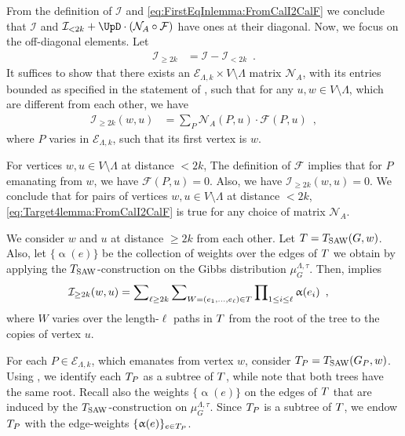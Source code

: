 \documentclass[11pt,reqno]{amsart}
\numberwithin{equation}{section}
\newcommand{\cE}{{\mathcal{E}}}
\newcommand{\cF}{{\mathcal{F}}}
\newcommand{\cI}{{\mathcal{I}}}
\newcommand{\cN}{{\mathcal{N}}}
\newcommand{\applegreen}[1]{ {\color{applegreen}#1}}
\newcommand{\blue}[1]{{\color{blue}#1}}
\newcommand{\bluepigment}[1]{{\color{blue(pigment)}#1}}
\newcommand{\capri}[1]{{\color{capri}#1}}
\newcommand{\goldenbrown}[1]{{\color{goldenbrown}#1}}
\newcommand{\iris}[1]{{\color{iris}#1}}
\newcommand{\red}[1]{{\color{red}#1}}
\newcommand{\ExtV}{\iris{\cE}}
\newcommand{\Tsaw}{T_{\rm SAW}}
\newcommand{\infmatrix}{\cI}
\newcommand{\VToEdge}{\UpD}
\renewcommand{\applegreen}[1]{#1}
\renewcommand{\blue}[1]{#1}
\renewcommand{\bluepigment}[1]{#1}
\renewcommand{\capri}[1]{#1}
\renewcommand{\goldenbrown}[1]{#1}
\renewcommand{\iris}[1]{#1}
\renewcommand{\red}[1]{#1}
\newcommand{\saw}{{\rm SAW}}
\newcommand{\ke}{\blue{e}}
\newcommand{\ki}{\capri{i}}
\newcommand{\kk}{\bluepigment{k}}
\newcommand{\kell}{{\color{green(pigment)}\ell}}%
\newcommand{\kP}{\goldenbrown{P}}
\newcommand{\ku}{\red{u}}
\newcommand{\kW}{\blue{W}}
\newcommand{\kw}{\blue{w}}
\renewcommand{\ke}{e}
\renewcommand{\ki}{i}
\renewcommand{\kk}{k}
\renewcommand{\kell}{\ell}
\renewcommand{\kP}{P}
\renewcommand{\ku}{u}
\renewcommand{\kW}{W}
\renewcommand{\kw}{w}
\newcommand{\SemExtdInfMatrix}{\cF}
\newcommand{\SymWeightMA}{\cN_A}
\newcommand{\infweight}{\upalpha}
\begin{document}
From the  definition of $\infmatrix$ and \eqref{eq:FirstEqInlemma:FromCalI2CalF} we conclude that $\infmatrix$ and 
$ \infmatrix_{<2\kk}+\VToEdge\cdot\left(\SymWeightMA \circ \SemExtdInfMatrix \right)$
have ones at their diagonal. 
%
Now, we focus on the off-diagonal elements. Let 
\begin{align}\label{eq:DefOfILarge2k}
\infmatrix_{\geq 2\kk} &=\infmatrix-\infmatrix_{<2\kk}\enspace.
\end{align}
It suffices to show that there exists an $\ExtV_{\Lambda,\kk}\times V\setminus \Lambda$ matrix $\SymWeightMA$, 
with its entries bounded as specified in the statement of ,   
such that for any $\ku,\kw\in V\setminus \Lambda$, which are different from each other, 
we have 
\begin{align}\label{eq:Target4lemma:FromCalI2CalF}
\infmatrix_{\geq 2\kk}(\kw,\ku) &= \sum\nolimits_{\kP} \SymWeightMA(\kP,\ku) \cdot \SemExtdInfMatrix(\kP,\ku)
\enspace,
\end{align}
where $\kP$ varies in $\ExtV_{\Lambda, \kk}$, such that its first vertex is $\kw$.




For vertices $\kw,\ku\in V\setminus \Lambda$ at distance $< 2\kk$,  The definition of  $\SemExtdInfMatrix$ implies that 
for  $\kP$ emanating from $\kw$, we have $ \SemExtdInfMatrix(\kP,\ku)=0$. Also, we have $\infmatrix_{\geq 2\kk}(\kw,\ku)=0$.
We conclude that for pairs of vertices  $\kw,\ku\in V\setminus \Lambda$ at distance $< 2\kk$,
 \eqref{eq:Target4lemma:FromCalI2CalF} is true for any choice of matrix $\SymWeightMA$. 




We consider  $\kw$ and $\ku$ at distance $\geq 2\kk$ from each other. Let $\EMTw=T_{\saw}(G, \kw)$.  Also, let $\{\infweight(\ke)\}$ 
be the collection of weights over the edges of $T$ we obtain  by applying the $\Tsaw$-construction on the Gibbs 
distribution $\mu^{\Lambda,\tau}_G$.  Then,  implies 
\begin{align}\label{eq:IfVsWeightscFVsVi}
\infmatrix_{\geq 2\kk}(\kw,\ku) &=\sum\nolimits_{\kell\geq 2\kk}
\sum\nolimits_{\kW=(\ke_1, \ldots, \ke_{\kell}) \in \EMTw}
\prod\nolimits_{1 \leq \ki\leq \kell}\infweight(\ke_{\ki}) \enspace,
\end{align}
where $\kW$ varies over the length-$\kell$ paths in $T$ from the root of the tree to the copies of vertex $\ku$.




For each $\kP\in \ExtV_{\Lambda,k}$, which emanates from vertex $\kw$, consider $\EMTPw=\Tsaw(\gext{G}{\kP},\kw)$. 
Using ,   we  identify each $\EMTPw$ as a subtree of $T$, while note that both trees
have the same root. Recall also the weights $\{\infweight(\ke)\}$ on the edges of $T$ that are induced by the 
$\Tsaw$-construction on $\mu^{\Lambda,\tau}_G$. Since $\EMTPw$ is a subtree of $T$, we endow 
$\EMTPw$ with the edge-weights $\{\infweight(\ke)\}_{\ke\in \EMTPw}$. 
\end{document}
